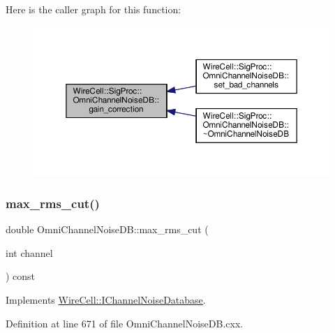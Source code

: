 Here is the caller graph for this function\+:
\nopagebreak
\begin{figure}[H]
\begin{center}
\leavevmode
\includegraphics[width=350pt]{class_wire_cell_1_1_sig_proc_1_1_omni_channel_noise_d_b_a60802eabcf081d7b82ed7b270dcefe00_icgraph}
\end{center}
\end{figure}
\mbox{\label{class_wire_cell_1_1_sig_proc_1_1_omni_channel_noise_d_b_a494d0e48066357d8e86ea7ce4d462bdb}} 
\subsubsection{\texorpdfstring{max\+\_\+rms\+\_\+cut()}{max\_rms\_cut()}}
{\footnotesize\ttfamily double Omni\+Channel\+Noise\+D\+B\+::max\+\_\+rms\+\_\+cut (\begin{DoxyParamCaption}\item[{int}]{channel }\end{DoxyParamCaption}) const\hspace{0.3cm}{\ttfamily [virtual]}}



Implements \hyperlink{class_wire_cell_1_1_i_channel_noise_database_ad5e4a49ff6b257e2ef290eeeaba95da7}{Wire\+Cell\+::\+I\+Channel\+Noise\+Database}.



Definition at line 671 of file Omni\+Channel\+Noise\+D\+B.\+cxx.

